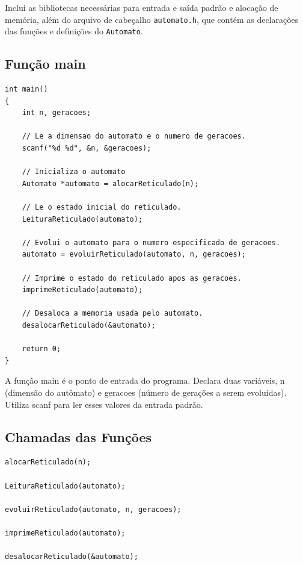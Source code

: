 \documentclass{article}
\begin{document}
\par Inclui as bibliotecas necessárias para entrada e saída padrão e alocação de memória, além do arquivo de cabeçalho \verb|automato.h|, que contém as declarações das funções e definições do \verb|Automato|.   

\subsection{Função main}

\begin{lstlisting}[caption={},label={lst:cod1},language={[x86masm]Assembler}]
int main()
{
    int n, geracoes;

    // Le a dimensao do automato e o numero de geracoes.
    scanf("%d %d", &n, &geracoes);

    // Inicializa o automato
    Automato *automato = alocarReticulado(n);

    // Le o estado inicial do reticulado.
    LeituraReticulado(automato);

    // Evolui o automato para o numero especificado de geracoes.
    automato = evoluirReticulado(automato, n, geracoes);

    // Imprime o estado do reticulado apos as geracoes.
    imprimeReticulado(automato);

    // Desaloca a memoria usada pelo automato.
    desalocarReticulado(&automato);

    return 0;
}
 \end{lstlisting}

 \par A função main é o ponto de entrada do programa. Declara duas variáveis, n (dimensão do autômato) e geracoes (número de gerações a serem evoluídas). Utiliza scanf para ler esses valores da entrada padrão.

\subsection{Chamadas das Funções}

\begin{lstlisting}[caption={},label={lst:cod1},language={[x86masm]Assembler}]
alocarReticulado(n);

LeituraReticulado(automato);

evoluirReticulado(automato, n, geracoes);

imprimeReticulado(automato);

desalocarReticulado(&automato);


\end{lstlisting}
\end{document}
